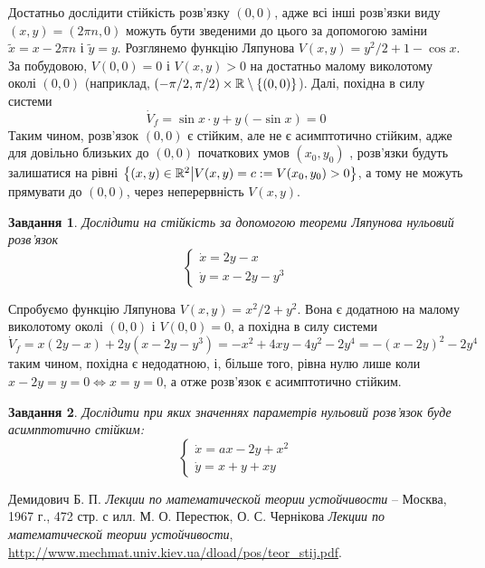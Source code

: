 \documentclass[12pt]{article} %
\newtheorem{prob}{Завдання}
\begin{document}
	Достатньо дослідити
	стійкість розв’язку $(0,0)$, адже всі інші розв’язки виду $(x,y)=(2\pi n,0)$ можуть бути зведеними до цього за допомогою
	заміни $\tilde{x}=x-2\pi n$ і $\tilde{y}=y$.
	Розглянемо функцію Ляпунова $V(x,y)=y^2/2+1-\cos x$. За побудовою, $V(0,0)=0$ і $V(x,y)>0$ на достатньо малому
	виколотому околі $(0,0)$ (наприклад, $(-\pi/2,\pi/2)\times\mathbb{R}\setminus\left\{(0,0)\right\}$). Далі, похідна в силу системи
	\[\dot{V}_f=\sin x\cdot y +y(-\sin x)=0\]
	Таким чином, розв’язок $(0,0)$ є стійким, але не є асимптотично стійким, адже для довільно близьких до $(0,0)$ початкових
	умов $(x_0,y_0)$
	, розв’язки будуть залишатися на рівні $\left\{(x,y)\in\mathbb{R}^2\big| V(x,y)=c:=V(x_0,y_0)>0\right\}$, а тому не можуть прямувати до
	$(0,0)$, через неперервність $V(x,y)$.
\begin{prob}Дослідити на стійкість за допомогою теореми Ляпунова нульовий розв’язок
	\[\begin{cases}\dot{x}=2y-x\\\dot{y}=x-2y-y^3\end{cases}\]\end{prob}
	Спробуємо функцію Ляпунова $V(x,y)=x^2/2+y^2$. Вона є додатною на малому виколотому околі $(0,0)$ і $V(0,0)=0$, а похідна
	в силу системи
	\[\dot{V}_f=x(2y-x)+2y(x-2y-y^3)=-x^2+4xy-4y^2-2y^4=-(x-2y)^2-2y^4\]
	таким чином, похідна є недодатною, і, більше того, рівна нулю лише коли $x-2y=y=0\iff x=y=0$, а отже розв’язок є асимптотично
	стійким.
\begin{prob}Дослідити при яких значеннях параметрів нульовий розв’язок буде асимптотично стійким:
	\[\begin{cases}\dot{x}=ax-2y+x^2\\\dot{y}=x+y+xy\end{cases}\]\end{prob}
\begin{thebibliography}{9}
Демидович Б. П. \emph{Лекции по математической теории устойчивости} --
Москва, 1967 г., 472 стр. с илл.
М. О. Перестюк, О. С. Чернікова \emph{Лекции по математической теории устойчивости}, \url{
http://www.mechmat.univ.kiev.ua/dload/pos/teor_stij.pdf}.
\end{thebibliography}
\end{document}
